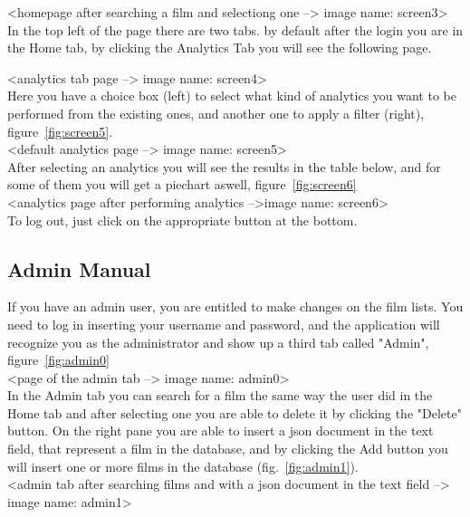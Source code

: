 \documentclass[a4paper, oneside]{article}
\begin{document}
<homepage after searching a film and selectiong one --> image name: screen3>\\

In the top left of the page there are two tabs. by default after the login you are in the Home tab, by clicking the Analytics Tab you will see the following page.

<analytics tab page --> image name: screen4>\\

Here you have a choice box (left) to select what kind of analytics you want to be performed from the existing ones, and another one to apply a filter (right), figure~\ref{fig:screen5}. \\

<default analytics page --> image name: screen5>\\

After selecting an analytics you will see the results in the table below, and for some of them you will get a piechart aswell, figure~\ref{fig:screen6}\\

<analytics page after performing analytics -->image name: screen6>\\

To log out, just click on the appropriate button at the bottom.

\clearpage
\subsection{Admin Manual}
If you have an admin user, you are entitled to make changes on the film lists. You need to log in inserting your username and password, and the application will recognize you as the administrator and show up a third tab called "Admin", figure~\ref{fig:admin0}\\

<page of the admin tab --> image name: admin0>\\

In the Admin tab you can search for a film the same way the user did in the Home tab and after selecting one you are able to delete it by clicking the "Delete" button. On the right pane you are able to insert a json document in the text field, that represent a film in the database, and by clicking the Add button you will insert one or more films in the database (fig.~\ref{fig:admin1}).\\ 

<admin tab after searching films and with a json document in the text field --> image name: admin1>
\end{document}

